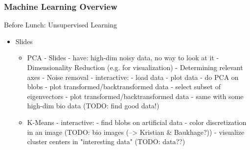 \documentclass[english,final,compress]{beamer}
\begin{document}
\begin{frame}
    \frametitle{Machine Learning Overview}
    Before Lunch: Unsupervised Learning
    \begin{itemize}
        \item Slides
            \begin{itemize}
                \item PCA
                    - Slides
                      - have: high-dim noisy data, no way to look at it
                      - Dimensionality Reduction (e.g. for visualization)
                      - Determining relevant axes
                      - Noise removal
                    - interactive:
                      - load data
                      - plot data
                      - do PCA on blobs
                      - plot transformed/backtransformed data
                      - select subset of eigenvectors
                      - plot transformed/backtransformed data
                      - same with some high-dim bio data (TODO: find good data!)
                \item K-Means
                    - interactive:
                      - find blobs on artificial data
                      - color discretization in an image (TODO: bio images (--> Kristian & Baukhage?))
                      - visualize cluster centers in "interesting data" (TODO: data??)
            \end{itemize}
    \end{itemize}


\end{frame}
\end{document}
